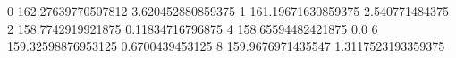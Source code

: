0 162.27639770507812 3.620452880859375
1 161.19671630859375 2.540771484375
2 158.7742919921875 0.11834716796875
4 158.65594482421875 0.0
6 159.32598876953125 0.6700439453125
8 159.9676971435547 1.3117523193359375
